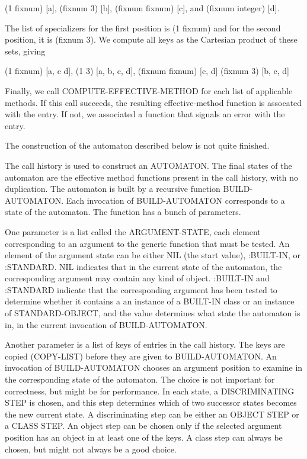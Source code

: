 (1 fixnum) [a],
(fixnum 3) [b],
(fixnum fixnum) [c], and
(fixnum integer) [d].  

The list of specializers for the first position is (1 fixnum) and for
the second position, it is (fixnum 3).  We compute all keys as the
Cartesian product of these sets, giving 

(1 fixnum) [a, c d], 
(1 3) [a, b, c, d], 
(fixnum fixnum) [c, d]
(fixnum 3) [b, c, d]

Finally, we call COMPUTE-EFFECTIVE-METHOD for each list of applicable
methods.  If this call succeeds, the resulting effective-method
function is assocated with the entry.  If not, we associated a
function that signals an error with the entry.

The construction of the automaton described below is not quite
finished.

The call history is used to construct an AUTOMATON.  The final states
of the automaton are the effective method functions present in the
call history, with no duplication.  The automaton is built by a
recursive function BUILD-AUTOMATON.  Each invocation of
BUILD-AUTOMATON corresponds to a state of the automaton.  The function
has a bunch of parameters.

One parameter is a list called the ARGUMENT-STATE, each element
corresponding to an argument to the generic function that must be
tested.  An element of the argument state can be either NIL (the start
value), :BUILT-IN, or :STANDARD.  NIL indicates that in the current
state of the automaton, the corresponding argument may contain any
kind of object.  :BUILT-IN and :STANDARD indicate that the
corresponding argument has been tested to determine whether it
contains a an instance of a BUILT-IN class or an instance of
STANDARD-OBJECT, and the value determines what state the automaton is
in, in the current invocation of BUILD-AUTOMATON.

Another parameter is a list of keys of entries in the call history.
The keys are copied (COPY-LIST) before they are given to
BUILD-AUTOMATON.  An invocation of BUILD-AUTOMATON chooses an argument
position to examine in the corresponding state of the automaton.  The
choice is not important for correctness, but might be for performance.
In each state, a DISCRIMINATING STEP is chosen, and this step
determines which of two successor states becomes the new current
state.  A discriminating step can be either an OBJECT STEP or a CLASS
STEP.  An object step can be chosen only if the selected argument
position has an object in at least one of the keys.  A class step can
always be chosen, but might not always be a good choice.

